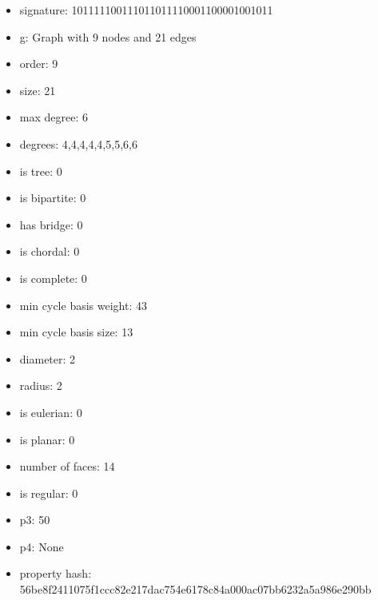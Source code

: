 \newpage
\begin{figure}
\end{figure}
\begin{itemize}
\item signature: 101111100111011011110001100001001011
\item g: Graph with 9 nodes and 21 edges
\item order: 9
\item size: 21
\item max degree: 6
\item degrees: 4,4,4,4,4,5,5,6,6
\item is tree: 0
\item is bipartite: 0
\item has bridge: 0
\item is chordal: 0
\item is complete: 0
\item min cycle basis weight: 43
\item min cycle basis size: 13
\item diameter: 2
\item radius: 2
\item is eulerian: 0
\item is planar: 0
\item number of faces: 14
\item is regular: 0
\item p3: 50
\item p4: None
\item property hash: 56be8f2411075f1ccc82e217dac754e6178c84a000ac07bb6232a5a986e290bb
\end{itemize}
